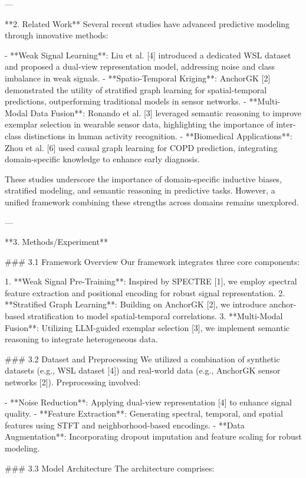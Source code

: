 ---

**2. Related Work**  
Several recent studies have advanced predictive modeling through innovative methods:  

- **Weak Signal Learning**: Liu et al. [4] introduced a dedicated WSL dataset and proposed a dual-view representation model, addressing noise and class imbalance in weak signals.  
- **Spatio-Temporal Kriging**: AnchorGK [2] demonstrated the utility of stratified graph learning for spatial-temporal predictions, outperforming traditional models in sensor networks.  
- **Multi-Modal Data Fusion**: Ronando et al. [3] leveraged semantic reasoning to improve exemplar selection in wearable sensor data, highlighting the importance of inter-class distinctions in human activity recognition.  
- **Biomedical Applications**: Zhou et al. [6] used causal graph learning for COPD prediction, integrating domain-specific knowledge to enhance early diagnosis.  

These studies underscore the importance of domain-specific inductive biases, stratified modeling, and semantic reasoning in predictive tasks. However, a unified framework combining these strengths across domains remains unexplored.

---

**3. Methods/Experiment**  

### 3.1 Framework Overview  
Our framework integrates three core components:  

1. **Weak Signal Pre-Training**: Inspired by SPECTRE [1], we employ spectral feature extraction and positional encoding for robust signal representation.  
2. **Stratified Graph Learning**: Building on AnchorGK [2], we introduce anchor-based stratification to model spatial-temporal correlations.  
3. **Multi-Modal Fusion**: Utilizing LLM-guided exemplar selection [3], we implement semantic reasoning to integrate heterogeneous data.  

### 3.2 Dataset and Preprocessing  
We utilized a combination of synthetic datasets (e.g., WSL dataset [4]) and real-world data (e.g., AnchorGK sensor networks [2]). Preprocessing involved:  

- **Noise Reduction**: Applying dual-view representation [4] to enhance signal quality.  
- **Feature Extraction**: Generating spectral, temporal, and spatial features using STFT and neighborhood-based encodings.  
- **Data Augmentation**: Incorporating dropout imputation and feature scaling for robust modeling.  

### 3.3 Model Architecture  
The architecture comprises:  

